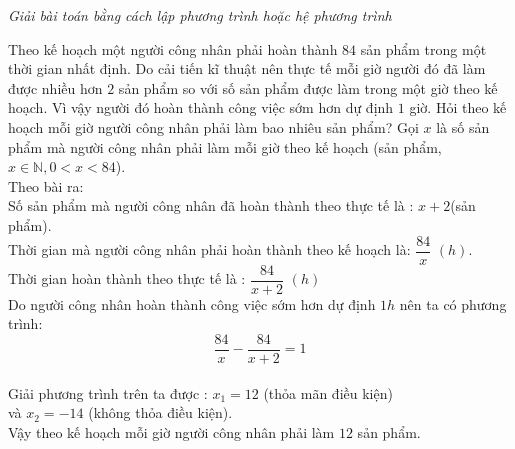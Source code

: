 \begin{ex}%
\textit{Giải bài toán bằng cách lập phương trình hoặc hệ phương trình}


    Theo kế hoạch một người công nhân phải hoàn thành $84$ sản phẩm trong một thời gian nhất định. Do cải tiến kĩ thuật nên thực tế mỗi giờ người đó đã làm được nhiều hơn $2$ sản phẩm so với số sản phẩm được làm trong một giờ theo kế hoạch. Vì vậy người đó hoàn thành công việc sớm hơn dự định $1$ giờ. Hỏi  theo kế hoạch mỗi giờ người công nhân phải làm bao nhiêu sản phẩm? 
\loigiai
    {
    Gọi $x$ là số sản phẩm mà người công nhân phải làm mỗi giờ theo kế hoạch (sản phẩm,$x\in\mathbb{N}, 0<x<84$).\\
    Theo bài ra:\\
    Số sản phẩm mà người công nhân đã hoàn thành theo thực tế là : $x+2$(sản phẩm).\\
    Thời gian mà người công nhân phải hoàn thành theo kế hoạch là: $\dfrac{84}{x}$ $(h)$.\\
    Thời gian hoàn thành theo thực tế là : $\dfrac{84}{x+2}$ $(h)$\\
    Do người công nhân hoàn thành công việc sớm hơn dự định $1h$ nên ta có phương trình: \\
    $$\dfrac{84}{x}-\dfrac{84}{x+2}=1$$\\
    Giải phương trình trên ta được : $x_1=12$ (thỏa mãn điều kiện)\\
    và $x_2=-14$ (không thỏa điều kiện).\\
    Vậy theo kế hoạch mỗi giờ người công nhân phải làm $12$ sản phẩm.
    }
\end{ex}

